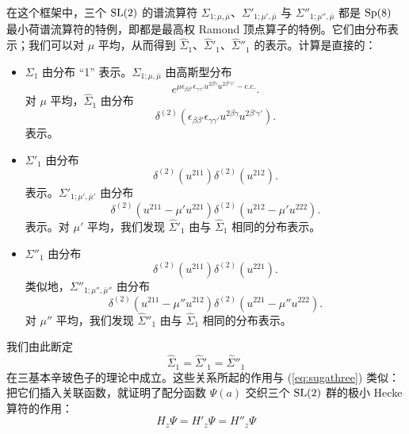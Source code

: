 在这个框架中，三个 ${\mathrm{SL}}(2)$ 的谱流算符 $\Sigma_{1;\mu, \bar \mu}$、$\Sigma'_{1;\mu', \bar \mu}$ 与 $\Sigma''_{1;\mu'', \bar \mu}$ 都是 ${\mathrm{Sp}}(8)$ 最小荷谱流算符的特例，即都是最高权 Ramond 顶点算子的特例。它们由分布表示；我们可以对 $\mu$ 平均，从而得到 $\hat \Sigma_{1}$、$\hat \Sigma'_{1}$、$\hat \Sigma''_{1}$ 的表示。计算是直接的：
\begin{itemize}
\item $\Sigma_1$ 由分布 “1” 表示。$\Sigma_{1;\mu, \bar \mu}$ 由高斯型分布
\begin{equation}
e^{\mu  \epsilon_{\beta \beta'}\epsilon_{\gamma \gamma'} u^{2\beta \gamma} u^{2 \beta' \gamma'}- \mathrm{c.c.}}.
\end{equation} 对 $\mu$ 平均，$\hat \Sigma_{1}$ 由分布
\begin{equation}
\delta^{(2)}(\epsilon_{\beta \beta'}\epsilon_{\gamma \gamma'} u^{2\beta \gamma} u^{2 \beta' \gamma'}).
\end{equation}
表示。
\item $\Sigma'_1$ 由分布 
\begin{equation}
\delta^{(2)}(u^{211})\delta^{(2)}(u^{212}).
\end{equation}
 表示。$\Sigma'_{1;\mu', \bar \mu'}$ 由分布 
\begin{equation}
\delta^{(2)}(u^{211}- \mu' u^{221})\delta^{(2)}(u^{212}- \mu' u^{222}).
\end{equation}
 表示。对 $\mu'$ 平均，我们发现 $\hat \Sigma'_{1}$ 由与 $\hat \Sigma_{1}$ 相同的分布表示。
\item $\Sigma''_1$ 由分布 
\begin{equation}
\delta^{(2)}(u^{211})\delta^{(2)}(u^{221}).
\end{equation}
类似地，$\Sigma''_{1;\mu'', \bar \mu''}$ 由分布 
\begin{equation}
\delta^{(2)}(u^{211}- \mu'' u^{212})\delta^{(2)}(u^{221}- \mu'' u^{222}).
\end{equation}
 对 $\mu''$ 平均，我们发现 $\hat \Sigma''_{1}$ 由与 $\hat \Sigma_{1}$ 相同的分布表示。
\end{itemize}
我们由此断定
\begin{equation}
\hat \Sigma_{1} = \hat \Sigma'_{1} =\hat \Sigma''_{1}
\end{equation}
在三基本辛玻色子的理论中成立。这些关系所起的作用与 (\ref{eq:sugathree}) 类似：把它们插入关联函数，就证明了配分函数 $\Psi(a)$ 交织三个 ${\mathrm{SL}}(2)$ 群的极小 Hecke 算符的作用：
\begin{equation}
\boxed{H_z \Psi =  H'_z \Psi = H''_z \Psi}
\end{equation}


